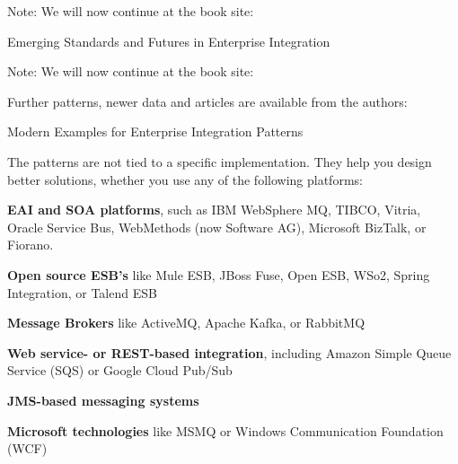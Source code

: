 \documentclass[Screen16to9,17pt]{foils}
\begin{document}
Note: We will now continue at the book site:\\
{\footnotesize{}}



\begin{list2}
\item Emerging Standards and Futures in Enterprise Integration
\end{list2}

Note: We will now continue at the book site:\\



\begin{quote}

\end{quote}

\begin{list2}
  \item Further patterns, newer data and articles are available from the authors:\\
\end{list2}




Modern Examples for Enterprise Integration Patterns\\
{\footnotesize{}}







The patterns are not tied to a specific implementation. They help you design better solutions, whether you use any of the following platforms:
\begin{list2}
  \item {\bf EAI and SOA platforms}, such as IBM WebSphere MQ, TIBCO, Vitria, Oracle Service Bus, WebMethods (now Software AG), Microsoft BizTalk, or Fiorano.
\item {\bf Open source ESB's} like Mule ESB, JBoss Fuse, Open ESB, WSo2, Spring Integration, or Talend ESB
\item {\bf Message Brokers} like ActiveMQ, Apache Kafka, or RabbitMQ
\item {\bf Web service- or REST-based integration}, including Amazon Simple Queue Service (SQS) or Google Cloud Pub/Sub
\item {\bf JMS-based messaging systems}
\item {\bf Microsoft technologies} like MSMQ or Windows Communication Foundation (WCF)
\end{list2}
\end{document}
